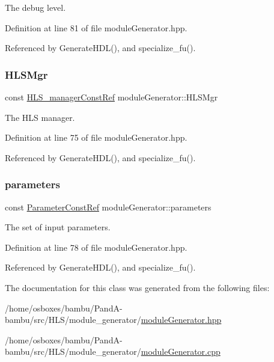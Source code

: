 The debug level. 



Definition at line 81 of file module\+Generator.\+hpp.



Referenced by Generate\+H\+D\+L(), and specialize\+\_\+fu().

\mbox{\label{classmoduleGenerator_ae8926f8dbd7191f2990ec3eb0bf796fe}} 
\subsubsection{\texorpdfstring{H\+L\+S\+Mgr}{HLSMgr}}
{\footnotesize\ttfamily const \hyperlink{hls__manager_8hpp_a1b481383e3beabc89bd7562ae672dd8c}{H\+L\+S\+\_\+manager\+Const\+Ref} module\+Generator\+::\+H\+L\+S\+Mgr\hspace{0.3cm}{\ttfamily [protected]}}



The H\+LS manager. 



Definition at line 75 of file module\+Generator.\+hpp.



Referenced by Generate\+H\+D\+L(), and specialize\+\_\+fu().

\mbox{\label{classmoduleGenerator_a15185f847acfd4e34cda7af7fc772c02}} 
\subsubsection{\texorpdfstring{parameters}{parameters}}
{\footnotesize\ttfamily const \hyperlink{Parameter_8hpp_a37841774a6fcb479b597fdf8955eb4ea}{Parameter\+Const\+Ref} module\+Generator\+::parameters\hspace{0.3cm}{\ttfamily [protected]}}



The set of input parameters. 



Definition at line 78 of file module\+Generator.\+hpp.



Referenced by Generate\+H\+D\+L(), and specialize\+\_\+fu().



The documentation for this class was generated from the following files\+:\begin{DoxyCompactItemize}
\item 
/home/osboxes/bambu/\+Pand\+A-\/bambu/src/\+H\+L\+S/module\+\_\+generator/\hyperlink{moduleGenerator_8hpp}{module\+Generator.\+hpp}\item 
/home/osboxes/bambu/\+Pand\+A-\/bambu/src/\+H\+L\+S/module\+\_\+generator/\hyperlink{moduleGenerator_8cpp}{module\+Generator.\+cpp}\end{DoxyCompactItemize}
